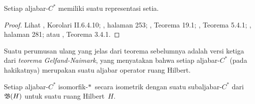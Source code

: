 \begin{thm}\label{thm_exist_faith_rep} Setiap aljabar-$C^*$ memiliki suatu representasi setia.
\end{thm}

\begin{proof} Lihat \cite{Blackadar:2006}, Korolari II.6.4.10; \cite{Conway:1990}, halaman 253;
\cite{DoranB:1986}, Teorema 19.1; \cite{Fillmore:1996}, Teorema 5.4.1;
\cite{KadisonR:1983}, halaman 281; atau \cite{Murphy:1990}, Teorema 3.4.1. \ns
\end{proof}

Suatu perumusan ulang yang jelas dari teorema sebelumnya adalah versi ketiga dari
\emph{teorema Gelfand-Naimark}, yang menyatakan bahwa setiap aljabar-$C^*$ (pada hakikatnya)
merupakan suatu aljabar operator ruang Hilbert.

\begin{cor}\label{002973} Setiap aljabar-$C^*$
isomorfik-$*\,$ secara isometrik dengan suatu subaljabar-$C^*$ dari $\mathfrak{B}(H)$ untuk suatu ruang
Hilbert~$H$.
\end{cor}


\endinput
